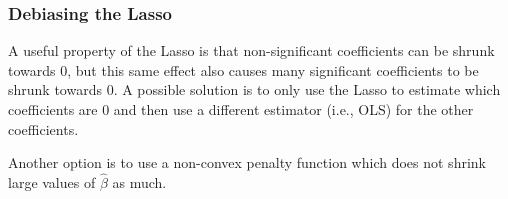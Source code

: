 \subsubsection{Debiasing the Lasso}
A useful property of the Lasso is that non-significant coefficients can be shrunk towards 0, but this same effect also causes many significant coefficients to be shrunk  towards 0. A possible solution is to only use the Lasso to estimate which coefficients are 0 and then use a different estimator (i.e., OLS) for the other coefficients. 

Another option is to use a non-convex penalty function which does not shrink large values of $\hat\beta$ as much. 
